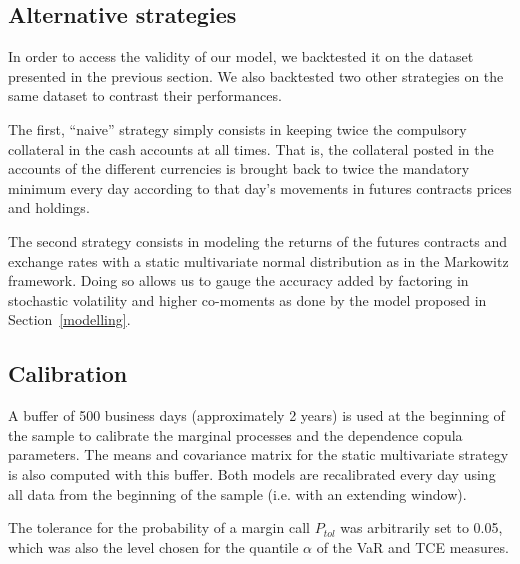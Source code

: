 \subsection{Alternative strategies}
\label{altstrats}
In order to access the validity of our model, we backtested it on
the dataset presented in the previous section. We also backtested
two other strategies on the same dataset to contrast their
performances.

The first, ``naive'' strategy simply consists in keeping twice the compulsory
collateral in the cash accounts at all times. That is, the collateral posted
in the accounts of the different currencies is brought back to twice the mandatory
minimum every day according to that day's movements in futures contracts prices
and holdings.

The second strategy consists in modeling the returns of the futures
contracts and exchange rates with a static multivariate normal
distribution as in the Markowitz framework. Doing so allows us to
gauge the accuracy added by factoring in stochastic volatility and
higher co-moments as done by the model proposed in
Section~\ref{modelling}.


\subsection{Calibration}
A buffer of 500 business days (approximately 2 years) is used at
the beginning of the sample to calibrate the marginal processes
and the dependence copula
parameters. The
means and covariance matrix for the static multivariate strategy
is also computed with this buffer. Both models are recalibrated
every day using all data from the beginning of the sample (i.e.
with an extending window).

The tolerance for the probability of a margin call $P_{tol}$ was
arbitrarily set to 0.05, which was also the level chosen for the
quantile $\alpha$ of the VaR and TCE measures.

